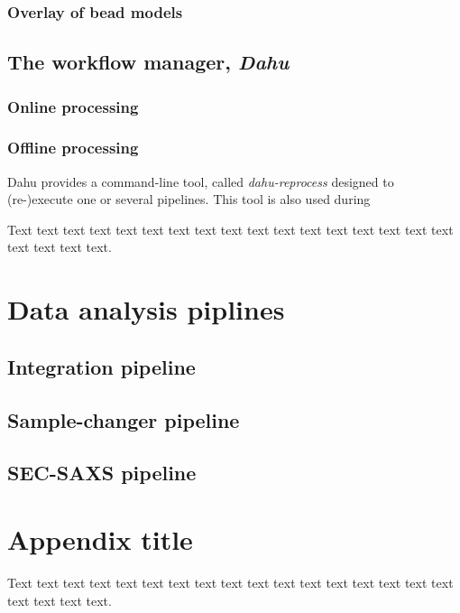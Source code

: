 \documentclass[preprint]{iucr}              %
\begin{document}
\subsubsection{Overlay of bead models}


\subsection{The workflow manager, \textit{Dahu}}

\subsubsection{Online processing}

\subsubsection{Offline processing}
Dahu provides a command-line tool, called \textit{dahu-reprocess} designed to 
(re-)execute one or several pipelines. 
This tool is also used during    



Text text text text text text text text text text text text text text
text text text text text text text.

\section{Data analysis piplines}
\subsection{Integration pipeline}
\subsection{Sample-changer pipeline}
\subsection{SEC-SAXS pipeline}


\appendix
\section{Appendix title}

Text text text text text text text text text text text text text text
text text text text text text text.
\end{document}
